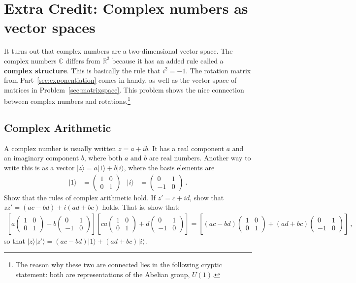 \documentclass[12pt]{article}
\numberwithin{equation}{section}    %
\begin{document}
\section{Extra Credit: Complex numbers as vector spaces}

It turns out that complex numbers are a two-dimensional vector space. The complex numbers $\mathbb{C}$ differs from $\mathbb{R}^2$ because it has an added rule called a \textbf{complex structure}. This is basically the rule that $i^2 = -1$. The rotation matrix from Part~\ref{sec:exponentiation} comes in handy, as well as the vector space of matrices in Problem~\ref{sec:matrixspace}. This problem shows the nice connection between complex numbers and rotations.\footnote{The reason why these two are connected lies in the following cryptic statement: both are representations of the Abelian group, $U(1)$.} 

\subsection{Complex Arithmetic}
A complex number is usually written $z = a+ib$. It has a real component $a$ and an imaginary component $b$, where both $a$ and $b$ are real numbers. Another way to write this is as a vector $|z\rangle = a|1\rangle + b|i\rangle$, where the basis elements are
\begin{align}
	|1\rangle &=
	\begin{pmatrix}
		1 & 0 \\ 0 & 1
	\end{pmatrix}
	&
	|i\rangle &=
	\begin{pmatrix}
		0 & 1 \\ -1 & 0
	\end{pmatrix} \ .
\end{align}
Show that the rules of complex arithmetic hold. If $z' = c+id$, show that $zz' = (ac - bd)+ i(ad+bc)$ holds. That is, show that:
\begin{align}
	\left[a\begin{pmatrix}
		1 & 0 \\ 0 & 1
	\end{pmatrix}+ 
	b\begin{pmatrix}
		0 & 1 \\ -1 & 0
	\end{pmatrix}\right]
  \left[ca\begin{pmatrix}
		1 & 0 \\ 0 & 1
	\end{pmatrix}+ 
	d\begin{pmatrix}
		0 & 1 \\ -1 & 0
	\end{pmatrix}\right]
	=
	\left[(ac-bd)\begin{pmatrix}
		1 & 0 \\ 0 & 1
	\end{pmatrix}+ 
	(ad+bc)\begin{pmatrix}
		0 & 1 \\ -1 & 0
	\end{pmatrix}\right] \ ,
\end{align}
so that $|z\rangle |z'\rangle = (ac - bd)|1\rangle+ (ad+bc)|i\rangle$.
\end{document}
